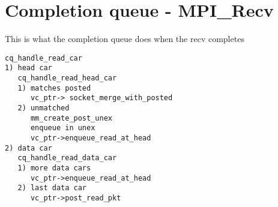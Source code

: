 \documentclass[dvipdfm,twoside,11pt]{article}
\begin{document}
\section{Completion queue - MPI_Recv}
This is what the completion queue does when the recv completes
\begin{verbatim}
cq_handle_read_car
1) head car
   cq_handle_read_head_car
   1) matches posted
      vc_ptr-> socket_merge_with_posted
   2) unmatched
      mm_create_post_unex
      enqueue in unex
      vc_ptr->enqueue_read_at_head
2) data car
   cq_handle_read_data_car
   1) more data cars
      vc_ptr->enqueue_read_at_head
   2) last data car
      vc_ptr->post_read_pkt
\end{verbatim}
\end{document}
